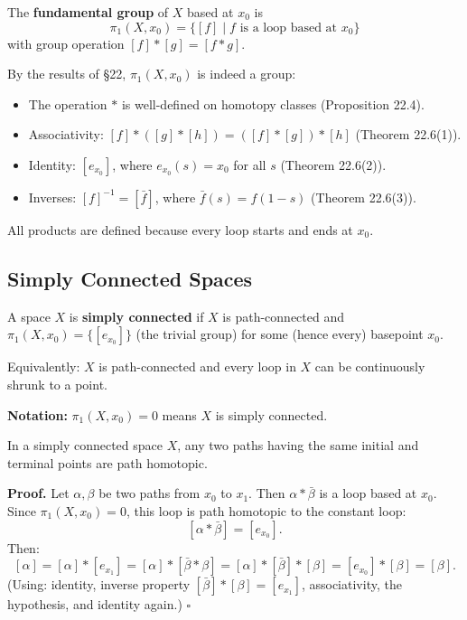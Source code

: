 \documentclass[11pt]{report}
\renewenvironment{proof}[1][Proof]{\noindent\textbf{#1.} }{\hfill$\square$\par\vspace{5pt}}
\begin{document}
\begin{defbox}
The \textbf{fundamental group} of $X$ based at $x_0$ is
\[\pi_1(X, x_0) = \{[f] \mid f \text{ is a loop based at } x_0\}\]
with group operation $[f] * [g] = [f * g]$.
\end{defbox}

\begin{rembox}
By the results of \S 22, $\pi_1(X, x_0)$ is indeed a group:
\begin{itemize}[nosep]
    \item The operation $*$ is well-defined on homotopy classes (Proposition 22.4).
    \item Associativity: $[f] * ([g] * [h]) = ([f] * [g]) * [h]$ (Theorem 22.6(1)).
    \item Identity: $[e_{x_0}]$, where $e_{x_0}(s) = x_0$ for all $s$ (Theorem 22.6(2)).
    \item Inverses: $[f]^{-1} = [\bar{f}]$, where $\bar{f}(s) = f(1-s)$ (Theorem 22.6(3)).
\end{itemize}
All products are defined because every loop starts and ends at $x_0$.
\end{rembox}

\subsection{Simply Connected Spaces}

\begin{defbox}
A space $X$ is \textbf{simply connected} if $X$ is path-connected and $\pi_1(X, x_0) = \{[e_{x_0}]\}$ (the trivial group) for some (hence every) basepoint $x_0$.

Equivalently: $X$ is path-connected and every loop in $X$ can be continuously shrunk to a point.

\textbf{Notation:} $\pi_1(X, x_0) = 0$ means $X$ is simply connected.
\end{defbox}

\begin{lembox}
In a simply connected space $X$, any two paths having the same initial and terminal points are path homotopic.
\end{lembox}

\begin{proof}
Let $\alpha, \beta$ be two paths from $x_0$ to $x_1$. Then $\alpha * \bar{\beta}$ is a loop based at $x_0$. Since $\pi_1(X, x_0) = 0$, this loop is path homotopic to the constant loop:
\[[\alpha * \bar{\beta}] = [e_{x_0}].\]
Then:
\[[\alpha] = [\alpha] * [e_{x_1}] = [\alpha] * [\bar{\beta} * \beta] = [\alpha] * [\bar{\beta}] * [\beta] = [e_{x_0}] * [\beta] = [\beta].\]
(Using: identity, inverse property $[\bar{\beta}] * [\beta] = [e_{x_1}]$, associativity, the hypothesis, and identity again.)
\end{proof}
\end{document}

